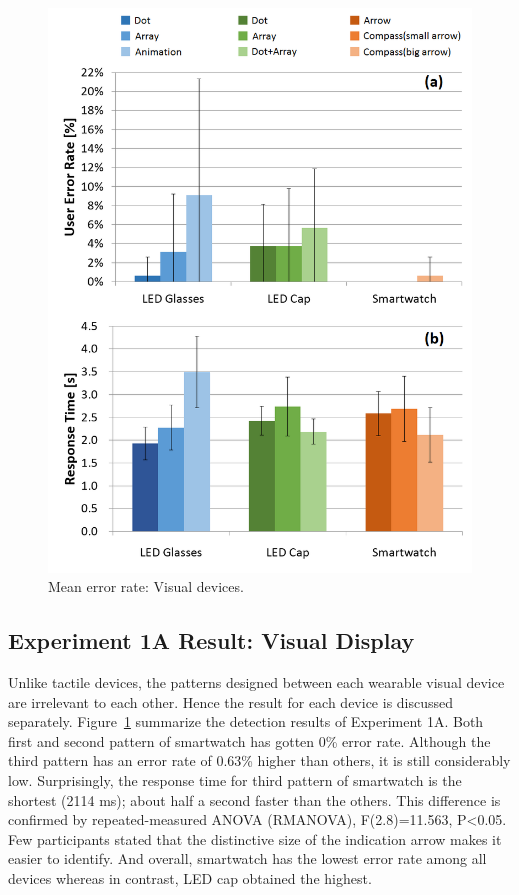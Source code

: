 \documentclass{sigchi}
\begin{document}
\begin{figure}[!t]
\centering
\includegraphics[width=\columnwidth]{stage1_Visual_ER&RT}
\caption{Mean error rate: Visual devices.}
\label{fig:visual_ER&RT}
\end{figure}


\subsection{Experiment 1A Result: Visual Display}
Unlike tactile devices, the patterns designed between each wearable visual device are irrelevant to each other. Hence the result for each device is discussed separately. Figure~\ref{fig:visual_ER&RT} summarize the detection results of Experiment 1A. Both first and second pattern of smartwatch has gotten 0\% error rate. Although the third pattern has an error rate of 0.63\% higher than others, it is still considerably low. Surprisingly, the response time for third pattern of smartwatch is the shortest (2114 ms); about half a second faster than the others. This difference is confirmed by repeated-measured ANOVA (RMANOVA), F(2.8)=11.563, P\textless0.05. Few participants stated that the distinctive size of the indication arrow makes it easier to identify. And overall, smartwatch has the lowest error rate among all devices whereas in contrast, LED cap obtained the highest.
\end{document}
